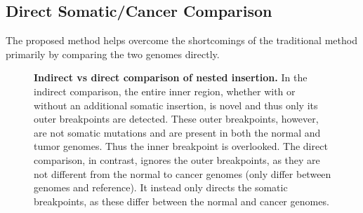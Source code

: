 \documentclass{easychithesis}
\begin{document}
\subsection{Direct Somatic/Cancer Comparison}
The proposed method helps overcome the shortcomings of the traditional method primarily by comparing the two genomes directly. 

\begin{figure}[ht]
\centering
{}
\quad
{}
%
\caption{{\bf Indirect vs direct comparison of nested insertion.} In the indirect comparison, the entire inner region, whether with or without an additional somatic insertion, is novel and thus only its outer breakpoints are detected. These outer breakpoints, however, are not somatic mutations and are present in both the normal and tumor genomes. Thus the inner breakpoint is overlooked. The direct comparison, in contrast, ignores the outer breakpoints, as they are not different from the normal to cancer genomes (only differ between genomes and reference). It instead only directs the somatic breakpoints, as these differ between the normal and cancer genomes.}
\label{fig:NestedInsertion}
\end{figure}
\end{document}
